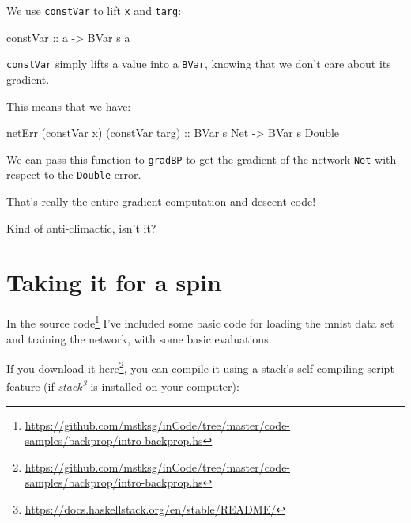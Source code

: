 \documentclass[]{article}
\newenvironment{Shaded}{}{}
\newcommand{\DataTypeTok}[1]{\textcolor[rgb]{0.56,0.13,0.00}{#1}}
\newcommand{\ExtensionTok}[1]{#1}
\newcommand{\NormalTok}[1]{#1}
\newcommand{\OtherTok}[1]{\textcolor[rgb]{0.00,0.44,0.13}{#1}}
\renewcommand{\href}[2]{#2\footnote{\url{#1}}}
\begin{document}
\begin{enumerate}
  We use \texttt{constVar} to lift \texttt{x} and \texttt{targ}:

\begin{Shaded}
\begin{Highlighting}[]
\OtherTok{constVar ::}\NormalTok{ a }\OtherTok{->} \DataTypeTok{BVar}\NormalTok{ s a}
\end{Highlighting}
\end{Shaded}

  \texttt{constVar} simply lifts a value into a \texttt{BVar}, knowing that we
  don't care about its gradient.

  This means that we have:

\begin{Shaded}
\begin{Highlighting}[]
\NormalTok{netErr (constVar x) (constVar targ)}\OtherTok{ ::} \DataTypeTok{BVar}\NormalTok{ s }\DataTypeTok{Net} \OtherTok{->} \DataTypeTok{BVar}\NormalTok{ s }\DataTypeTok{Double}
\end{Highlighting}
\end{Shaded}

  We can pass this function to \texttt{gradBP} to get the gradient of the
  network \texttt{Net} with respect to the \texttt{Double} error.
\end{enumerate}

That's really the entire gradient computation and descent code!

Kind of anti-climactic, isn't it?

\hypertarget{taking-it-for-a-spin}{%
\section{Taking it for a spin}\label{taking-it-for-a-spin}}

In the
\href{https://github.com/mstksg/inCode/tree/master/code-samples/backprop/intro-backprop.hs}{source
code} I've included some basic code for loading the mnist data set and training
the network, with some basic evaluations.

If you download it
\href{https://github.com/mstksg/inCode/tree/master/code-samples/backprop/intro-backprop.hs}{here},
you can compile it using a stack's self-compiling script feature (if
\emph{\href{https://docs.haskellstack.org/en/stable/README/}{stack}} is
installed on your computer):

\begin{Shaded}
\end{Shaded}
\end{document}

